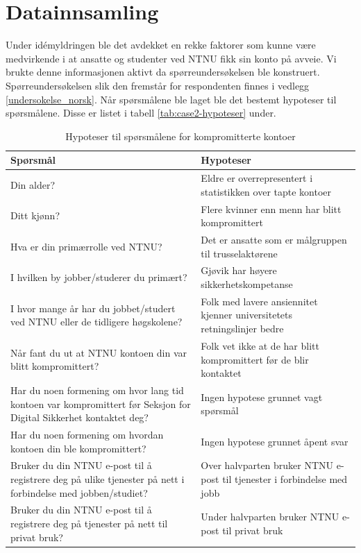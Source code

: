 \section{Datainnsamling}
Under idémyldringen ble det avdekket en rekke faktorer som kunne være medvirkende i at ansatte og studenter ved NTNU fikk sin konto på avveie. Vi brukte denne informasjonen aktivt da spørreundersøkelsen ble konstruert. Spørreundersøkelsen slik den fremstår for respondenten finnes i vedlegg \ref{undersokelse_norsk}. Når spørsmålene ble laget ble det bestemt hypoteser til spørsmålene. Disse er listet i tabell \ref{tab:case2-hypoteser} under. 

\begin{table}[H]
  \centering
  \caption{Hypoteser til spørsmålene for kompromitterte kontoer}
    \begin{tabular}{|p{20.215em}|p{20.57em}|}
    \hline
    \rowcolor{yellow} Spørsmål & Hypoteser \\
    \hline
    Din alder? & Eldre er overrepresentert i statistikken over tapte kontoer \\
    \hline
    Ditt kjønn? & Flere kvinner enn menn har blitt kompromittert \\
    \hline
    Hva er din primærrolle ved NTNU? & Det er ansatte som er målgruppen til trusselaktørene \\
    \hline
    I hvilken by jobber/studerer du primært? & Gjøvik har høyere sikkerhetskompetanse \\
    \hline
    I hvor mange år har du jobbet/studert ved NTNU eller de tidligere høgskolene? & Folk med lavere ansiennitet kjenner universitetets retningslinjer bedre \\
    \hline
    Når fant du ut at NTNU kontoen din var blitt kompromittert? & Folk vet ikke at de har blitt kompromittert før de blir kontaktet \\
    \hline
    Har du noen formening om hvor lang tid kontoen var kompromittert før Seksjon for Digital Sikkerhet kontaktet deg? & Ingen hypotese grunnet vagt spørsmål \\
    \hline
    Har du noen formening om hvordan kontoen din ble kompromittert? & Ingen hypotese grunnet åpent svar \\
    \hline
    Bruker du din NTNU e-post til å registrere deg på ulike tjenester på nett i forbindelse med jobben/studiet? & Over halvparten bruker NTNU e-post til tjenester i forbindelse med jobb \\
    \hline
    Bruker du din NTNU e-post til å registrere deg på tjenester på nett til privat bruk? & Under halvparten bruker NTNU e-post til privat bruk \\

\end{tabular}
\end{table}

